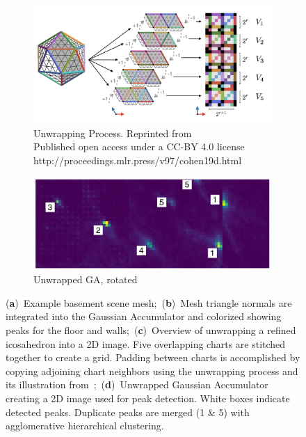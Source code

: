\begin{figure}[H]
\begin{subfigure}[t]{.40\linewidth}
  \end{subfigure}
  \par\bigskip
  \begin{subfigure}[t]{.55\linewidth}
    \includegraphics[width=0.90\linewidth]{chapter_3_polylidar3d/imgs/ico_unwrap.pdf}
    \caption{Unwrapping Process. Reprinted from ~\cite{cohen_gauge_2019} \\ Published open access under a CC-BY 4.0 license \\ http://proceedings.mlr.press/v97/cohen19d.html%
    \label{fig:ch3_process_unwrap}}\vspace{6pt}

  \end{subfigure}
  \hfill
  \begin{subfigure}[t]{.40\linewidth}
    \centering\includegraphics[clip,trim=0cm 0cm 0cm 0cm,width=.95\linewidth]{chapter_3_polylidar3d/imgs/ga_examples-ga_basement_unwrapped_v2.pdf}
    \caption{Unwrapped GA, rotated \label{fig:ch3_basement_unwrapped}}\vspace{6pt}
  \end{subfigure}
  \caption{(\textbf{a})~Example basement scene mesh;~(\textbf{b})~Mesh triangle normals are integrated into the Gaussian Accumulator and colorized showing peaks for the floor and walls;~(\textbf{c})~Overview of unwrapping a refined icosahedron into a 2D image. Five overlapping charts are stitched together to create a grid. Padding between charts is accomplished by copying adjoining chart neighbors using the unwrapping process and its illustration from~\cite{cohen_gauge_2019};~(\textbf{d})~Unwrapped Gaussian Accumulator creating a 2D image used for peak detection.  White boxes indicate detected peaks. Duplicate peaks are merged (1 \& 5) with agglomerative hierarchical clustering. 
  }\label{fig:ch3_peak_detection}
\end{figure}

